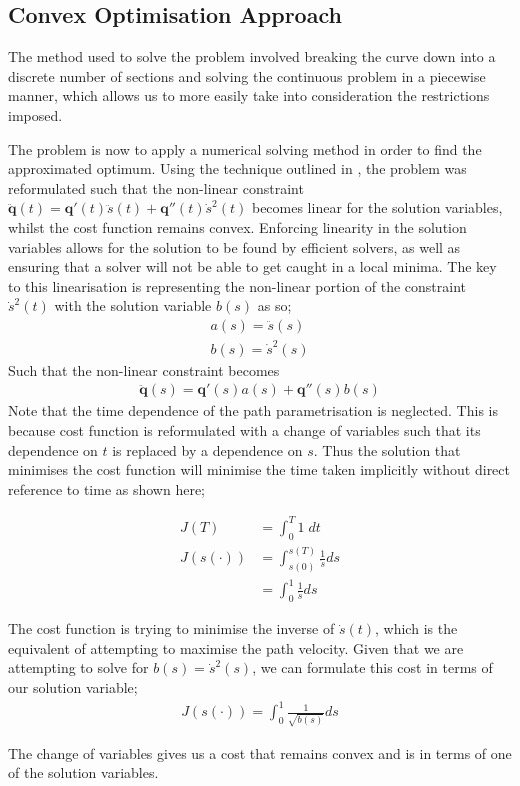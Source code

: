 \subsection{Convex Optimisation Approach}
The method used to solve the problem involved breaking the curve down into a discrete number of sections and solving the continuous problem in a piecewise manner, which allows us to more easily take into consideration the restrictions imposed.

The problem is now to apply a numerical solving method in order to find the approximated optimum. Using the technique outlined in \cite{Schutter09}, the problem was reformulated such that the non-linear constraint $\ddot{\textbf{q}}(t) = \textbf{q}'(t)\ddot{s}(t) + \textbf{q}''(t)\dot{s}^2(t)$ becomes linear for the solution variables, whilst the cost function remains convex. Enforcing linearity in the solution variables allows for the solution to be found by efficient solvers, as well as ensuring that a solver will not be able to get caught in a local minima.
The key to this linearisation is representing the non-linear portion of the constraint $\dot{s}^2(t)$ with the solution variable $b(s)$ as so;
\begin{align*}
a(s) = \ddot{s}(s)\\
b(s) = \dot{s}^2(s)
\end{align*}
Such that the non-linear constraint becomes
\begin{align*}
\ddot{\textbf{q}}(s) = \textbf{q}'(s)a(s) + \textbf{q}''(s)b(s)
\end{align*}
Note that the time dependence of the path parametrisation is neglected. This is because cost function is reformulated with a change of variables such that its dependence on $t$ is replaced by a dependence on $s$. Thus the solution that minimises the cost function will minimise the time taken implicitly without direct reference to time as shown here;

\begin{align*}
J(T) &= \int_0^T1\;dt\\
J(s(\cdot)) &= \int_{s(0)}^{s(T)} \frac{1}{\dot{s}}ds\\
	&= \int_0^1\frac{1}{\dot{s}}ds
\end{align*}

The cost function is trying to minimise the inverse of $\dot{s}(t)$, which is the equivalent of attempting to maximise the path velocity. Given that we are attempting to solve for $b(s) = \dot{s}^2(s)$, we can formulate this cost in terms of our solution variable;
\begin{align*}
J(s(\cdot)) = \int_0^1\frac{1}{\sqrt{b(s)}}ds
\end{align*}

The change of variables gives us a cost that remains convex and is in terms of one of the solution variables.